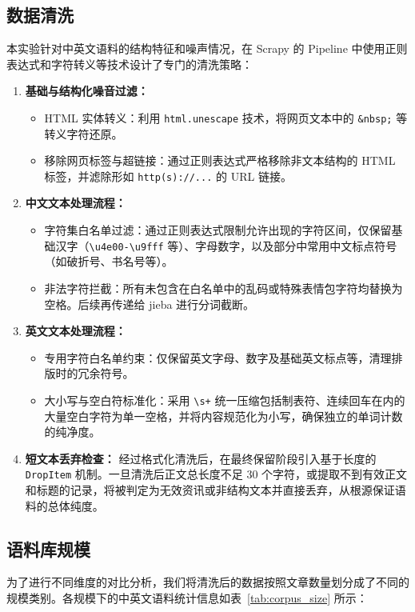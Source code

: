 \documentclass[11pt]{article}
\begin{document}
\subsection{数据清洗}
本实验针对中英文语料的结构特征和噪声情况，在 Scrapy 的 Pipeline 中使用正则表达式和字符转义等技术设计了专门的清洗策略：
\begin{enumerate}
    \item \textbf{基础与结构化噪音过滤：}
    \begin{itemize}
        \item HTML 实体转义：利用 \texttt{html.unescape} 技术，将网页文本中的 \verb|&nbsp;| 等转义字符还原。
        \item 移除网页标签与超链接：通过正则表达式严格移除非文本结构的 HTML 标签，并滤除形如 \texttt{http(s)://...} 的 URL 链接。
    \end{itemize}
    \item \textbf{中文文本处理流程：}
    \begin{itemize}
        \item 字符集白名单过滤：通过正则表达式限制允许出现的字符区间，仅保留基础汉字（\verb|\u4e00-\u9fff| 等）、字母数字，以及部分中常用中文标点符号（如破折号、书名号等）。
        \item 非法字符拦截：所有未包含在白名单中的乱码或特殊表情包字符均替换为空格。后续再传递给 jieba 进行分词截断。
    \end{itemize}
    \item \textbf{英文文本处理流程：}
    \begin{itemize}
        \item 专用字符白名单约束：仅保留英文字母、数字及基础英文标点等，清理排版时的冗余符号。
        \item 大小写与空白符标准化：采用 \verb|\s+| 统一压缩包括制表符、连续回车在内的大量空白字符为单一空格，并将内容规范化为小写，确保独立的单词计数的纯净度。
    \end{itemize}
    \item \textbf{短文本丢弃检查：}
    经过格式化清洗后，在最终保留阶段引入基于长度的 \texttt{DropItem} 机制。一旦清洗后正文总长度不足 30 个字符，或提取不到有效正文和标题的记录，将被判定为无效资讯或非结构文本并直接丢弃，从根源保证语料的总体纯度。
\end{enumerate}

\subsection{语料库规模}
为了进行不同维度的对比分析，我们将清洗后的数据按照文章数量划分成了不同的规模类别。各规模下的中英文语料统计信息如表~\ref{tab:corpus_size} 所示：
\end{document}
